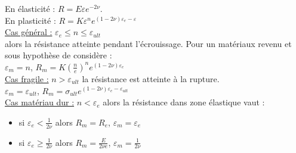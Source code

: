 \documentclass[../main.tex]{subfiles}
\begin{document}
En élasticité : $R = E \varepsilon e^{-2\nu}$.\\
En plasticité : $R=K\varepsilon^n e^{(1-2\nu)\varepsilon_e - \varepsilon}$\\

\underline{Cas général :} $\varepsilon_e \leq n \leq \varepsilon_{ult}$\\
alors la résistance atteinte pendant l'écrouissage. Pour un matériaux revenu et sous hypothèse de considère :\\
$\varepsilon_m = n$, $R_m = K(\frac{n}{e})^ne^{(1-2\nu)\varepsilon_e}$\\

\underline{Cas fragile :} $n >\varepsilon_{ult}$ la résistance est atteinte à la rupture. \\
$\varepsilon_m = \varepsilon_{ult}$, $R_m = \sigma_{ult} e^{(1-2\nu)\varepsilon_e - \varepsilon_{ult}}$\\

\underline{Cas matériau dur :} $n < \varepsilon_e$ alors la résistance dans zone élastique vaut :\\
\begin{itemize}
    \item si $\varepsilon_e < \frac{1}{2\nu}$ alors $R_m = R_e$, $\varepsilon_m = \varepsilon_e$\\
    \item si $\varepsilon_e \geq \frac{1}{2\nu}$ alors $R_m = \frac{E}{2\nu e}$, $\varepsilon_m = \frac{1}{2\nu}$\\
\end{itemize}
\end{document}
